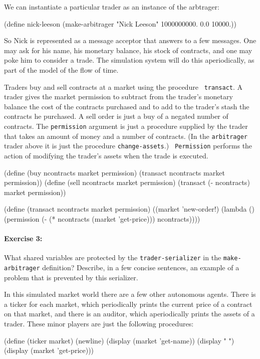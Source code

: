 We can instantiate a particular trader as an instance of the
arbtrager:

\beginlisp
(define nick-leeson
  (make-arbitrager "Nick Leeson" 1000000000. 0.0 10000.))
\endlisp

So Nick is represented as a message acceptor that answers to a few
messages.  One may ask for his name, his monetary balance, his stock
of contracts, and one may poke him to consider a trade.  The
simulation system will do this aperiodically, as part of the model of
the flow of time.

Traders buy and sell contracts at a market using the procedure {\tt
transact}.  A trader gives the market permission to subtract from the
trader's monetary balance the cost of the contracts purchased and to
add to the trader's stash the contracts he purchased.  A sell order is
just a buy of a negated number of contracts.  The {\tt permission}
argument is just a procedure supplied by the trader that takes an
amount of money and a number of contracts.  (In the {\tt arbitrager}
trader above it is just the procedure {\tt change-assets}.)  {\tt
Permission} performs the action of modifying the trader's assets when
the trade is executed.

\beginlisp
(define (buy ncontracts market permission)
  (transact ncontracts market permission))
\null
(define (sell ncontracts market permission)
  (transact (- ncontracts) market permission))
\endlisp

\beginlisp
(define (transact ncontracts market permission)
  ((market 'new-order!)
   (lambda ()
     (permission (- (* ncontracts (market 'get-price)))
                 ncontracts))))
\endlisp


\paragraph{Exercise 3:}
What shared variables are protected by the
{\tt trader-serializer} in the {\tt make-arbitrager} definition?
Describe, in a few concise sentences, an example of a problem that is
prevented by this serializer.

In this simulated market world there are a few other autonomous
agents.  There is a ticker for each market, which periodically prints
the current price of a contract on that market, and there is an
auditor, which aperiodically prints the assets of a trader.
These minor players are just the following procedures:

\beginlisp
(define (ticker market)
  (newline)
  (display (market 'get-name))
  (display "            ")
  (display (market 'get-price)))
\endlisp

